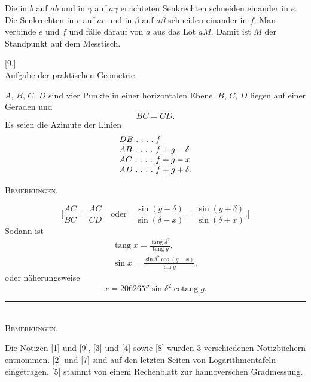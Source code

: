 Die in $b$ auf $ab$ und in $\gamma$ auf $a\gamma$ errichteten Senkrechten schneiden einander in $e$. Die Senkrechten in $c$ auf $ac$ und in $\beta$ auf $a\beta$ schneiden einander in $f$. Man verbinde $e$ und $f$ und fälle darauf von $a$ aus das Lot $aM$. Damit ist $M$ der Standpunkt auf dem Messtisch.
\bigskip
\begin{center}[9.]\\[5pt]Aufgabe der praktischen Geometrie.\end{center}
$A$, $B$, $C$, $D$ sind vier Punkte in einer horizontalen Ebene. $B$, $C$, $D$ liegen auf einer Geraden und
\[
BC=CD.
\]
Es seien die Azimute der Linien
\[
\begin{array}{l@{\;}l}
DB\ .\ .\ .\ .&f\\
AB\ .\ .\ .\ .&f+g-\delta\\
AC\ .\ .\ .\ .&f+g-x\\
AD\ .\ .\ .\ .&f+g+\delta.
\end{array}
\]
\begin{center}
\end{center}

\clearpage
{}\hfill\textsc{Bemerkungen.}\hfill\mbox{}\par\medskip
\[
\bigg[\frac{AC}{BC}=\frac{AC}{CD}\quad\text{oder}\quad
\frac{\sin(g-\delta)}{\sin(\delta-x)}=\frac{\sin(g+\delta)}{\sin(\delta+x)}.\bigg]
\]
Sodann ist
\[
\begin{gathered}
\operatorname{tang}x=\frac{\operatorname{tang}\delta^2}{\operatorname{tang}g},\\[6pt]
\sin x=\frac{\sin\delta^2\cos(g-x)}{\sin g},
\end{gathered}
\]
oder näherungsweise
\[
x=206265''\sin\delta^2\operatorname{cotang}g.
\]
\bigskip
\begin{center}\rule{3cm}{.4pt}\\[6pt]\textsc{Bemerkungen.}\end{center}
\begingroup\footnotesize
Die Notizen [1] und [9], [3] und [4] sowie [8] wurden 3 verschiedenen Notizbüchern entnommen. [2] und [7] sind auf den letzten Seiten von Logarithmentafeln eingetragen. [5] stammt von einem Rechenblatt zur hannoverschen Gradmessung.

